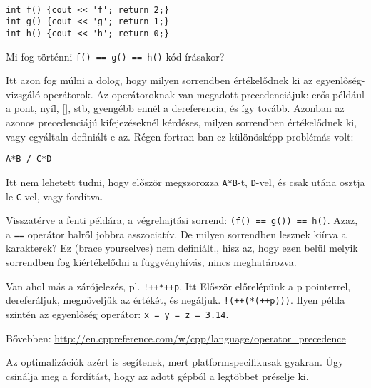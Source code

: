 \documentclass[a4paper,11.5pt]{article}
\begin{document}
	\begin{example}\ 
		
		\begin{lstlisting}
int f() {cout << 'f'; return 2;}
int g() {cout << 'g'; return 1;}
int h() {cout << 'h'; return 0;}
		\end{lstlisting}
		Mi fog történni \texttt{f() == g() == h()} kód írásakor?
		
		Itt azon fog múlni a dolog, hogy milyen sorrendben értékelődnek ki az egyenlőség-vizsgáló operátorok. Az operátoroknak van megadott precedenciájuk: erős például a pont, nyíl, [], stb, gyengébb ennél a dereferencia, és így tovább. Azonban az azonos precedenciájú kifejezéseknél kérdéses, milyen sorrendben értékelődnek ki, vagy egyáltaln definiált-e az. Régen fortran-ban ez különösképp problémás volt:
		
		\begin{center}
			\texttt{A*B / C*D}
		\end{center}Itt nem lehetett tudni, hogy először megszorozza \texttt{A*B}-t, \texttt{D}-vel, és csak utána osztja le \texttt{C}-vel, vagy fordítva.
		
		Visszatérve a fenti példára, a végrehajtási sorrend:
		 \texttt{(f() == g()) == h()}. Azaz, a \texttt{==} operátor balről jobbra asszociatív. De milyen sorrendben lesznek kiírva a karakterek? Ez (brace yourselves) nem definiált., hisz az, hogy ezen belül melyik sorrendben fog kiértékelődni a függvényhívás, nincs meghatározva.
		 
		 Van ahol más a zárójelezés, pl. \texttt{!++*++p}. Itt Először előrelépünk a p pointerrel, dereferáljuk, megnöveljük az értékét, és negáljuk. \texttt{!(++(*(++p)))}. Ilyen példa szintén az egyenlőség operátor: \texttt{x = y = z = 3.14}. 
		 \begin{note}
		 	Bővebben: \url{http://en.cppreference.com/w/cpp/language/operator_precedence}
		 \end{note}
	\end{example}
	Az optimalizációk azért is segítenek, mert platformspecifikusak gyakran. Úgy csinálja meg a fordítást, hogy az adott gépból a legtöbbet préselje ki.
\end{document}
